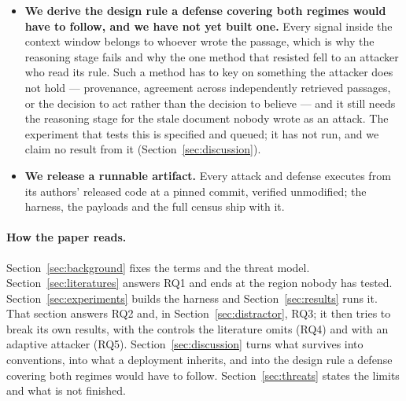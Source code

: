\begin{itemize}
\item \textbf{We derive the design rule a defense covering both regimes
  would have to follow, and we have not yet built one.} Every signal inside
  the context window belongs to whoever wrote the passage, which is why the
  reasoning stage fails and why the one method that resisted fell to an
  attacker who read its rule. Such a method has to key on something the
  attacker does not hold --- provenance, agreement across independently
  retrieved passages, or the decision to act rather than the decision to
  believe --- and it still needs the reasoning stage for the stale document
  nobody wrote as an attack. The experiment that tests this is specified and
  queued; it has not run, and we claim no result from it
  (Section~\ref{sec:discussion}).

\item \textbf{We release a runnable artifact.} Every attack and defense
  executes from its authors' released code at a pinned commit, verified
  unmodified; the harness, the payloads and the full census ship with it.
\end{itemize}

\paragraph{How the paper reads.} Section~\ref{sec:background} fixes the
terms and the threat model. Section~\ref{sec:literatures} answers RQ1 and
ends at the region nobody has tested. Section~\ref{sec:experiments} builds
the harness and Section~\ref{sec:results} runs it. That section answers RQ2
and, in Section~\ref{sec:distractor}, RQ3; it then tries to break its own
results, with the controls the literature omits (RQ4) and with an adaptive
attacker (RQ5). Section~\ref{sec:discussion} turns what
survives into conventions, into what a deployment inherits, and into the
design rule a defense covering both regimes would have to follow.
Section~\ref{sec:threats} states the limits and what is not finished.
